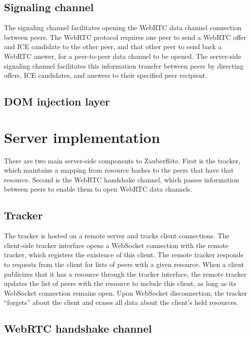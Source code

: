 \documentclass[letterpaper,twocolumn,10pt]{article}
\newcommand{\zbf}{Zauberfl\"{o}te\xspace}
\begin{document}
\subsection{Signaling channel}

The signaling channel facilitates opening the WebRTC data channel connection between
peers. The WebRTC protocol requires one peer to send a WebRTC offer and ICE candidate
to the other peer, and that other peer to send back a WebRTC answer, for a peer-to-peer
data channel to be opened. The server-side signaling channel facilitates this
information transfer between peers by  directing offers, ICE candidates, and answers
to their specified peer recipient.

\subsection{DOM injection layer}

\section{Server implementation}

There are two main server-side components to \zbf. First is the tracker,
which maintains a mapping from resource hashes to the peers that have that
resource. Second is the WebRTC handshake channel, which passes information
between peers to enable them to open WebRTC data channels.

\subsection{Tracker}
The tracker is hosted on a remote server and tracks client connections.
The client-side tracker interface  opens a WebSocket connection with the remote tracker,
which registers the existence of this client. The remote tracker responds to
requests from the client for lists of peers with a given resource. When a client
publicizes that it has a resource through the tracker interface, the remote tracker updates
the list of peers with the resource to include this client, as
long as its WebSocket connection remains open. Upon WebSocket disconnection,
the tracker ``forgets'' about the client and erases all data about the client's
held resources.

\subsection{WebRTC handshake channel}
\end{document}
